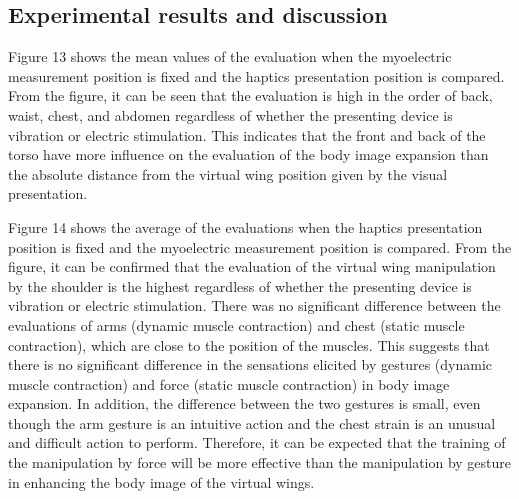 \documentclass[letterpaper, 10 pt, conference]{ieeeconf}  %
\begin{document}
        \subsection{Experimental results and discussion}




                Figure 13 shows the mean values of the evaluation when the myoelectric measurement position is fixed and the haptics presentation position is compared.
                From the figure, it can be seen that the evaluation is high in the order of back, waist, chest, and abdomen regardless of whether the presenting device is vibration or electric stimulation.
                This indicates that the front and back of the torso have more influence on the evaluation of the body image expansion than the absolute distance from the virtual wing position given by the visual presentation.

                Figure 14 shows the average of the evaluations when the haptics presentation position is fixed and the myoelectric measurement position is compared.
                From the figure, it can be confirmed that the evaluation of the virtual wing manipulation by the shoulder is the highest regardless of whether the presenting device is vibration or electric stimulation. 
                There was no significant difference between the evaluations of arms (dynamic muscle contraction) and chest (static muscle contraction), which are close to the position of the muscles. 
                This suggests that there is no significant difference in the sensations elicited by gestures (dynamic muscle contraction) and force (static muscle contraction) in body image expansion. 
                In addition, the difference between the two gestures is small, even though the arm gesture is an intuitive action and the chest strain is an unusual and difficult action to perform. 
                Therefore, it can be expected that the training of the manipulation by force will be more effective than the manipulation by gesture in enhancing the body image of the virtual wings.
\end{document}
